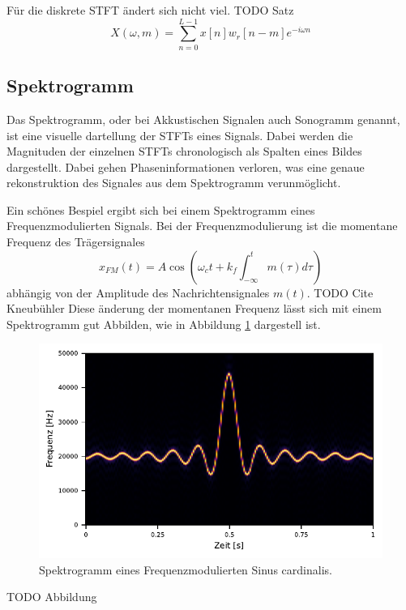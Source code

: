 Für die diskrete STFT ändert sich nicht viel.
TODO Satz
\begin{equation}
    X(\omega, m) = \sum_{n = 0}^{L - 1} x[n] w_r[n-m] e^{ -i \omega n}
\end{equation}
\subsection{Spektrogramm}

Das Spektrogramm, oder bei Akkustischen Signalen auch Sonogramm genannt, ist eine visuelle
dartellung der STFTs eines Signals. 
Dabei werden die Magnituden der einzelnen STFTs chronologisch
als Spalten eines Bildes dargestellt.
Dabei gehen Phaseninformationen verloren, was eine genaue rekonstruktion
des Signales aus dem Spektrogramm verunmöglicht.

Ein schönes Bespiel ergibt sich bei einem Spektrogramm eines Frequenzmodulierten 
Signals.
Bei der Frequenzmodulierung ist die momentane Frequenz des Trägersignales 
\begin{equation}
    x_{FM}(t) = A \cos\left( \omega_c t + k_f \int_{-\infty}^{t} m(\tau) d\tau\right)
\end{equation}
abhängig von der Amplitude des Nachrichtensignales $m(t)$.
TODO Cite Kneubühler
Diese änderung der momentanen Frequenz lässt sich mit einem Spektrogramm gut Abbilden, 
wie in Abbildung \ref{sonogramm:fmsono} dargestell ist.
\begin{figure}
    \centering
    \includegraphics{papers/sonogramm/images/fm_sono_windows.pdf}
    \caption{Spektrogramm eines Frequenzmodulierten Sinus cardinalis.
    \label{sonogramm:fmsono}
    }
\end{figure}
TODO Abbildung
